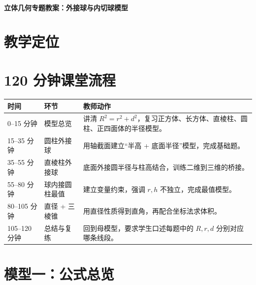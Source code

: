 \documentclass[11pt,a4paper]{ctexart}
\begin{document}
\begin{center}
  {\Large\bfseries 立体几何专题教案：外接球与内切球模型}
\end{center}

\section{教学定位}



\section{120 分钟课堂流程}

\begin{tabularx}{\textwidth}{p{2.8cm}p{3cm}X}
\toprule
时间 & 环节 & 教师动作\\
\midrule
0--15 分钟 & 模型总览 & 讲清 $R^2=r^2+d^2$，复习正方体、长方体、直棱柱、圆柱、正四面体的半径模型。\\ \midrule
15--35 分钟 & 圆柱外接球 & 用轴截面建立“半高 + 底面半径”模型，完成基础题。\\ \midrule
35--55 分钟 & 直棱柱外接球 & 底面外接圆半径与柱高结合，训练二维到三维的桥接。\\ \midrule
55--80 分钟 & 球内接圆柱最值 & 建立变量约束，强调 $r,h$ 不独立，完成最值模型。\\ \midrule
80--105 分钟 & 直径 + 三棱锥 & 用直径性质得到直角，再配合坐标法求体积。\\ \midrule
105--120 分钟 & 总结与复练 & 回到母模型，要求学生口述每题中的 $R,r,d$ 分别对应哪条线段。\\
\bottomrule
\end{tabularx}

\newpage

\section{模型一：公式总览}
\end{document}
